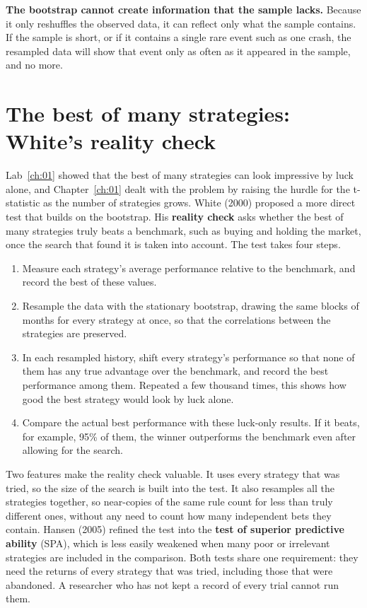 \textbf{The bootstrap cannot create information that the sample lacks.} Because it only reshuffles the observed data, it can reflect only what the sample contains. If the sample is short, or if it contains a single rare event such as one crash, the resampled data will show that event only as often as it appeared in the sample, and no more.

\section{The best of many strategies: White's reality check}
\label{sec:03-reality}

Lab~\ref{ch:01} showed that the best of many strategies can look impressive by luck alone, and Chapter~\ref{ch:01} dealt with the problem by raising the hurdle for the t-statistic as the number of strategies grows. White (2000) proposed a more direct test that builds on the bootstrap. His \textbf{reality check} asks whether the best of many strategies truly beats a benchmark, such as buying and holding the market, once the search that found it is taken into account. The test takes four steps.

\begin{enumerate}
  \item Measure each strategy's average performance relative to the benchmark, and record the best of these values.
  \item Resample the data with the stationary bootstrap, drawing the same blocks of months for every strategy at once, so that the correlations between the strategies are preserved.
  \item In each resampled history, shift every strategy's performance so that none of them has any true advantage over the benchmark, and record the best performance among them. Repeated a few thousand times, this shows how good the best strategy would look by luck alone.
  \item Compare the actual best performance with these luck-only results. If it beats, for example, 95\% of them, the winner outperforms the benchmark even after allowing for the search.
\end{enumerate}

Two features make the reality check valuable. It uses every strategy that was tried, so the size of the search is built into the test. It also resamples all the strategies together, so near-copies of the same rule count for less than truly different ones, without any need to count how many independent bets they contain. Hansen (2005) refined the test into the \textbf{test of superior predictive ability} (SPA), which is less easily weakened when many poor or irrelevant strategies are included in the comparison. Both tests share one requirement: they need the returns of every strategy that was tried, including those that were abandoned. A researcher who has not kept a record of every trial cannot run them.

